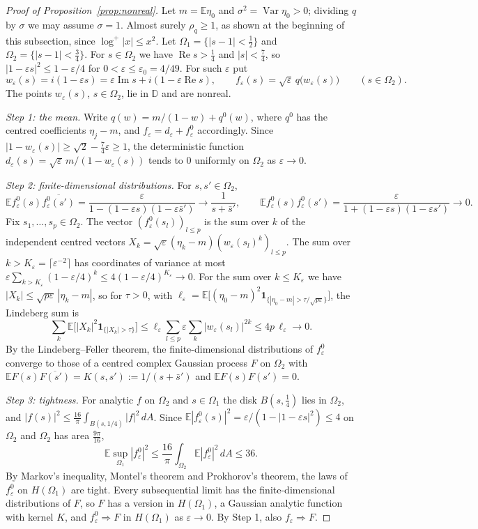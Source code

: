 \documentclass[11pt]{amsart}
\theoremstyle{definition}
\theoremstyle{remark}
\numberwithin{equation}{section}
\newcommand{\D}{\mathbb{D}}
\newcommand{\E}{\mathbb{E}}
\newcommand{\eps}{\varepsilon}
\DeclareMathOperator{\re}{Re}
\DeclareMathOperator{\im}{Im}
\begin{document}
\begin{proof}[Proof of Proposition~\ref{prop:nonreal}]
Let $m=\E\eta_0$ and $\sigma^2=\operatorname{Var}\eta_0>0$; dividing $q$ by $\sigma$ we may assume $\sigma=1$. Almost surely $\rho_q\ge1$, as shown at the beginning of this subsection, since $\log^+|x|\le x^2$. Let $\Omega_1=\{|s-1|<\frac12\}$ and $\Omega_2=\{|s-1|<\frac34\}$. For $s\in\Omega_2$ we have $\re s>\frac14$ and $|s|<\frac74$, so $|1-\eps s|^2\le1-\eps/4$ for $0<\eps\le\eps_0=4/49$. For such $\eps$ put
\[
w_\eps(s)=i(1-\eps s)=\eps\im s+i(1-\eps\re s),\qquad f_\eps(s)=\sqrt\eps\,q\bigl(w_\eps(s)\bigr)\qquad(s\in\Omega_2).
\]
The points $w_\eps(s)$, $s\in\Omega_2$, lie in $\D$ and are nonreal.

\emph{Step 1: the mean.} Write $q(w)=m/(1-w)+q^0(w)$, where $q^0$ has the centred coefficients $\eta_j-m$, and $f_\eps=d_\eps+f^0_\eps$ accordingly. Since $|1-w_\eps(s)|\ge\sqrt2-\frac74\eps\ge1$, the deterministic function $d_\eps(s)=\sqrt\eps\,m/(1-w_\eps(s))$ tends to $0$ uniformly on $\Omega_2$ as $\eps\to0$.

\emph{Step 2: finite-dimensional distributions.} For $s,s'\in\Omega_2$,
\[
\E f^0_\eps(s)\overline{f^0_\eps(s')}=\frac{\eps}{1-(1-\eps s)(1-\eps\bar s')}\to\frac1{s+\bar s'},\qquad\E f^0_\eps(s)f^0_\eps(s')=\frac{\eps}{1+(1-\eps s)(1-\eps s')}\to0 .
\]
Fix $s_1,\dots,s_p\in\Omega_2$. The vector $(f^0_\eps(s_l))_{l\le p}$ is the sum over $k$ of the independent centred vectors $X_k=\sqrt\eps(\eta_k-m)(w_\eps(s_l)^k)_{l\le p}$. The sum over $k>K_\eps=\lceil\eps^{-2}\rceil$ has coordinates of variance at most $\eps\sum_{k>K_\eps}(1-\eps/4)^k\le4(1-\eps/4)^{K_\eps}\to0$. For the sum over $k\le K_\eps$ we have $|X_k|\le\sqrt{p\eps}\,|\eta_k-m|$, so for $\tau>0$, with $\ell_\eps=\E\bigl[(\eta_0-m)^2\mathbf 1_{\{|\eta_0-m|>\tau/\sqrt{p\eps}\}}\bigr]$, the Lindeberg sum is
\[
\sum_{k}\E\bigl[|X_k|^2\mathbf 1_{\{|X_k|>\tau\}}\bigr]\le\ell_\eps\sum_{l\le p}\eps\sum_k|w_\eps(s_l)|^{2k}\le4p\,\ell_\eps\to0 .
\] By the Lindeberg--Feller theorem, the finite-dimensional distributions of $f^0_\eps$ converge to those of a centred complex Gaussian process $F$ on $\Omega_2$ with $\E F(s)\overline{F(s')}=K(s,s'):=1/(s+\bar s')$ and $\E F(s)F(s')=0$.

\emph{Step 3: tightness.} For analytic $f$ on $\Omega_2$ and $s\in\Omega_1$ the disk $B(s,\frac14)$ lies in $\Omega_2$, and $|f(s)|^2\le\frac{16}\pi\int_{B(s,1/4)}|f|^2\,dA$. Since $\E|f^0_\eps(s)|^2=\eps/(1-|1-\eps s|^2)\le4$ on $\Omega_2$ and $\Omega_2$ has area $\frac{9\pi}{16}$,
\[
\E\sup_{\Omega_1}|f^0_\eps|^2\le\frac{16}\pi\int_{\Omega_2}\E|f^0_\eps|^2\,dA\le36 .
\]
By Markov's inequality, Montel's theorem and Prokhorov's theorem, the laws of $f^0_\eps$ on $H(\Omega_1)$ are tight. Every subsequential limit has the finite-dimensional distributions of $F$, so $F$ has a version in $H(\Omega_1)$, a Gaussian analytic function with kernel $K$, and $f^0_\eps\Rightarrow F$ in $H(\Omega_1)$ as $\eps\to0$. By Step 1, also $f_\eps\Rightarrow F$.


\end{proof}
\end{document}
